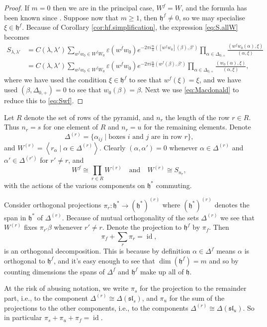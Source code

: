 \documentclass[12pt]{amsart}
\theoremstyle{plain}
\theoremstyle{definition}
\numberwithin{equation}{section}
\DeclareMathOperator{\id}{id}
\newcommand{\al}{\alpha}
\newcommand{\la}{\lambda}
\newcommand{\D}{\Delta}
\newcommand{\h}{\mathfrak{h}}
\newcommand{\sll}{\mathfrak{sl}}
\begin{document}
\begin{proof}
If $m = 0$ then we are in the principal case, $W^f = W$, and the formula has been known since \cite{FKW}. Suppose now that $m \geq 1$, then $\h^f \neq 0$, so we may specialise $\xi \in \h^f$. Because of Corollary \ref{cor:hf.simplification}, the expression \eqref{eq:S.allW} becomes
\begin{align*}
S_{\la, \la'} &= C(\la, \la') \sum_{w^f w_0 \in W^f W_0} \varepsilon(w^f w_0) e^{-2\pi i \frac{n}{u} ([w^f w_0](\beta), \beta')} \prod_{\al \in \D_{0, +}} \frac{(w^f w_0(\al), \xi)}{(\al, \xi)} \\
%
&= C(\la, \la') \sum_{w^f w_0 \in W^f W_0} \varepsilon(w^f w_0) e^{-2\pi i \frac{n}{u} (w^f(\beta), \beta')} \prod_{\al \in \D_{0, +}} \frac{(w_0(\al), \xi)}{(\al, \xi)},
\end{align*}
where we have used the condition $\xi \in \h^f$ to see that $w^f(\xi) = \xi$, and we have used $(\beta, \D_{0, +}) = 0$ to see that $w_0(\beta)=\beta$. Next we use \eqref{eq:Macdonald} to reduce this to \eqref{eq:Swf}.
\end{proof}

Let $R$ denote the set of rows of the pyramid, and $n_r$ the length of the row $r \in R$. Thus $n_r = s$ for one element of $R$ and $n_r = u$ for the remaining elements. Denote
\[
\D^{(r)} = \{\al_{ij} \mid \text{boxes $i$ and $j$ are in row $r$}\},
\]
and $W^{(r)} = \left<r_\al \mid \al \in \D^{(r)}\right>$. Clearly $(\al, \al') = 0$ whenever $\al \in \D^{(r)}$ and $\al'\in \D^{(r')}$ for $r'\neq r$, and
\[
W^f \cong \prod_{r \in R} W^{(r)} \quad \text{and} \quad W^{(r)} \cong S_{n_r},
\]
with the actions of the various components on $\h^*$ commuting.

Consider orthogonal projections $\pi_r : \h^* \rightarrow (\h^*)^{(r)}$ where $(\h^*)^{(r)}$ denotes the span in $\h^*$ of $\D^{(r)}$. Because of mutual orthogonality of the sets $\D^{(r)}$ we see that $W^{(r)}$ fixes $\pi_{r'}\beta$ whenever $r'\neq r$. Denote the projection to $\h^f$ by $\pi_f$. Then
\[
\pi_f + \sum_r \pi_r = \id,
\]
is an orthogonal decomposition. This is because by definition $\al \in \D^f$ means $\al$ is orthogonal to $\h^f$, and it's easy enough to see that $\dim(\h^f)=m$ and so by counting dimensions the spans of $\D^f$ and $\h^f$ make up all of $\h$.

At the risk of abusing notation, we write $\pi_s$ for the projection to the remainder part, i.e., to the component $\D^{(r)} \cong \D(\sll_s)$, and $\pi_u$ for the sum of the projections to the other components, i.e., to the components $\D^{(r)} \cong \D(\sll_u)$. So in particular $\pi_s + \pi_u + \pi_f = \id$.
\end{document}
